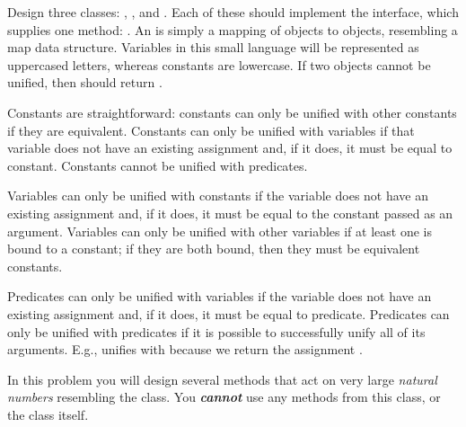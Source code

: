 Design three classes: , , and . Each of these should implement the  interface, which supplies one method: . An  is simply a mapping of  objects to  objects, resembling a map data structure. Variables in this small language will be represented as uppercased letters, whereas constants are lowercase. If two  objects cannot be unified, then  should return .

Constants are straightforward: constants can only be unified with other constants if they are equivalent. Constants can only be unified with variables if that variable does not have an existing assignment and, if it does, it must be equal to  constant. Constants cannot be unified with predicates.

Variables can only be unified with constants if the variable does not have an existing assignment and, if it does, it must be equal to the constant passed as an argument. Variables can only be unified with other variables if at least one is bound to a constant; if they are both bound, then they must be equivalent constants. 

Predicates can only be unified with variables if the variable does not have an existing assignment and, if it does, it must be equal to  predicate. Predicates can only be unified with predicates if it is possible to successfully unify all of its arguments. E.g.,  unifies with  because we return the assignment . 

In this problem you will design several methods that act on very large \emph{natural numbers} resembling the  class. You \emph{\textbf{cannot}} use any methods from this class, or the class itself. 


